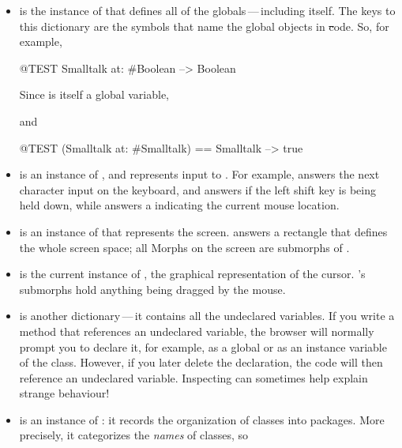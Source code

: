 \documentclass[a4paper,10pt,twoside]{book}
\begin{document}
\begin{itemize}
\item
{} is the instance of  that defines all of the globals\,---\,including  itself.   
The keys to this dictionary are the symbols that name the global objects in \st code.
So, for example,
\begin{code}{@TEST}
Smalltalk at: #Boolean --> Boolean
\end{code}
Since  is itself a global variable,
\begin{code}{}
Smalltalk at: #Smalltalk-->a SystemDictionary(lots of globals)}
\end{code} 
and
\begin{code}{@TEST}
(Smalltalk at: #Smalltalk) == Smalltalk --> true
\end{code}

\item {} is an instance of , and represents input to \pharo.
For example,  answers the next character input on the keyboard, and  answers  if the left shift key is being held down, while  answers a  indicating the current mouse location.

\item {} is an instance of  that represents the screen.
 answers a rectangle that defines the whole screen space; all Morphs on the screen are submorphs of .

\item 
{} is the current instance of , the graphical representation of the cursor.  's submorphs hold anything being dragged by the mouse.

\item
{} is another dictionary\,---\,it contains all the undeclared variables.
If you write a method that references an undeclared variable, the browser will normally
prompt you to declare it, for example, as a global or as an instance variable of the class.
However, if you later delete the declaration, the code will then reference an undeclared variable.
Inspecting  can sometimes help explain strange behaviour!

\item
{} is an instance of : it records the organization of classes into packages.  More precisely, it categorizes the \emph{names} of classes, so
\end{itemize}
\end{document}
